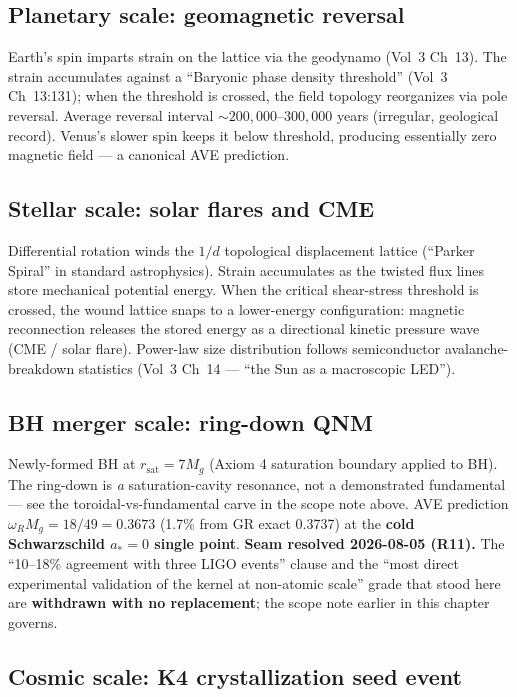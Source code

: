 \subsection{Planetary scale: geomagnetic reversal}

Earth's spin imparts strain on the lattice via the geodynamo (Vol~3
Ch~13). The strain accumulates against a ``Baryonic phase density
threshold'' (Vol~3 Ch~13:131); when the threshold is crossed, the
field topology reorganizes via pole reversal. Average reversal
interval $\sim 200{,}000$--$300{,}000$ years (irregular, geological
record). Venus's slower spin keeps it below threshold, producing
essentially zero magnetic field --- a canonical AVE prediction.

\subsection{Stellar scale: solar flares and CME}

Differential rotation winds the $1/d$ topological displacement lattice
(``Parker Spiral'' in standard astrophysics). Strain accumulates as
the twisted flux lines store mechanical potential energy. When the
critical shear-stress threshold is crossed, the wound lattice
snaps to a lower-energy configuration: magnetic reconnection
releases the stored energy as a directional kinetic pressure wave
(CME / solar flare). Power-law size distribution follows
semiconductor avalanche-breakdown statistics (Vol~3 Ch~14 ---
``the Sun as a macroscopic LED'').

\subsection{BH merger scale: ring-down QNM}

Newly-formed BH at $r_{\text{sat}} = 7 M_g$ (Axiom 4 saturation boundary applied to BH). The
ring-down is \emph{a} saturation-cavity resonance, not a demonstrated fundamental --- see the
toroidal-vs-fundamental carve in the scope note above. AVE prediction $\omega_R M_g = 18/49 =
0.3673$ (1.7\% from GR exact 0.3737) at the \textbf{cold Schwarzschild $a_* = 0$ single point}.
\textbf{Seam resolved 2026-08-05 (R11).} The ``10--18\% agreement with three LIGO events'' clause
and the ``most direct experimental validation of the kernel at non-atomic scale'' grade that
stood here are \textbf{withdrawn with no replacement}; the scope note earlier in this chapter governs.

\subsection{Cosmic scale: K4 crystallization seed event}

